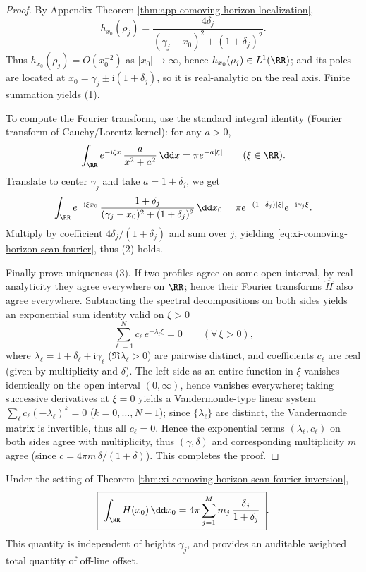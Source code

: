 \begin{proof}
By Appendix Theorem \ref{thm:app-comoving-horizon-localization},
\[
h_{x_0}(\rho_j)=\frac{4\delta_j}{(\gamma_j-x_0)^2+(1+\delta_j)^2}.
\]
Thus \(h_{x_0}(\rho_j)=O(x_0^{-2})\) as \(|x_0|\to\infty\), hence \(h_{x_0}(\rho_j)\in L^1(\RR)\); and its poles are located at \(x_0=\gamma_j\pm \mathrm{i}(1+\delta_j)\), so it is real-analytic on the real axis. Finite summation yields (1).
\par
To compute the Fourier transform, use the standard integral identity (Fourier transform of Cauchy/Lorentz kernel): for any \(a>0\),
\[
\int_{\RR}e^{-\mathrm{i}\xi x}\,\frac{a}{x^2+a^2}\,\dd x
=\pi e^{-a|\xi|}\qquad(\xi\in\RR).
\]
Translate to center \(\gamma_j\) and take \(a=1+\delta_j\), we get
\[
\int_{\RR}e^{-\mathrm{i}\xi x_0}\,\frac{1+\delta_j}{(\gamma_j-x_0)^2+(1+\delta_j)^2}\,\dd x_0
=\pi e^{-(1+\delta_j)|\xi|}e^{-\mathrm{i}\gamma_j\xi}.
\]
Multiply by coefficient \(4\delta_j/(1+\delta_j)\) and sum over \(j\), yielding \eqref{eq:xi-comoving-horizon-scan-fourier}, thus (2) holds.
\par
Finally prove uniqueness (3). If two profiles agree on some open interval, by real analyticity they agree everywhere on \(\RR\); hence their Fourier transforms \(\widehat H\) also agree everywhere.
Subtracting the spectral decompositions on both sides yields an exponential sum identity valid on \(\xi>0\)
\[
\sum_{\ell=1}^{N}c_{\ell}\,e^{-\lambda_{\ell}\xi}=0\qquad(\forall\,\xi>0),
\]
where \(\lambda_{\ell}=1+\delta_{\ell}+\mathrm{i}\gamma_{\ell}\) (\(\Re\lambda_{\ell}>0\)) are pairwise distinct, and coefficients \(c_{\ell}\) are real (given by multiplicity and \(\delta\)).
The left side as an entire function in \(\xi\) vanishes identically on the open interval \((0,\infty)\), hence vanishes everywhere; taking successive derivatives at \(\xi=0\) yields a Vandermonde-type linear system
\(
\sum_{\ell}c_{\ell}(-\lambda_{\ell})^{k}=0
\)
(\(k=0,\dots,N-1\)); since \(\{\lambda_{\ell}\}\) are distinct, the Vandermonde matrix is invertible, thus all \(c_{\ell}=0\).
Hence the exponential terms \((\lambda_{\ell},c_{\ell})\) on both sides agree with multiplicity, thus \((\gamma,\delta)\) and corresponding multiplicity \(m\) agree (since \(c=4\pi m\,\delta/(1+\delta)\)).
This completes the proof.
\end{proof}

\begin{corollary}\label{cor:xi-comoving-horizon-scan-mass}
Under the setting of Theorem \ref{thm:xi-comoving-horizon-scan-fourier-inversion},
\[
\boxed{\ \int_{\RR}H(x_0)\,\dd x_0
=4\pi\sum_{j=1}^{M} m_j\,\frac{\delta_j}{1+\delta_j}\ }.
\]
This quantity is independent of heights \(\gamma_j\), and provides an auditable weighted total quantity of off-line offset.
\end{corollary}

